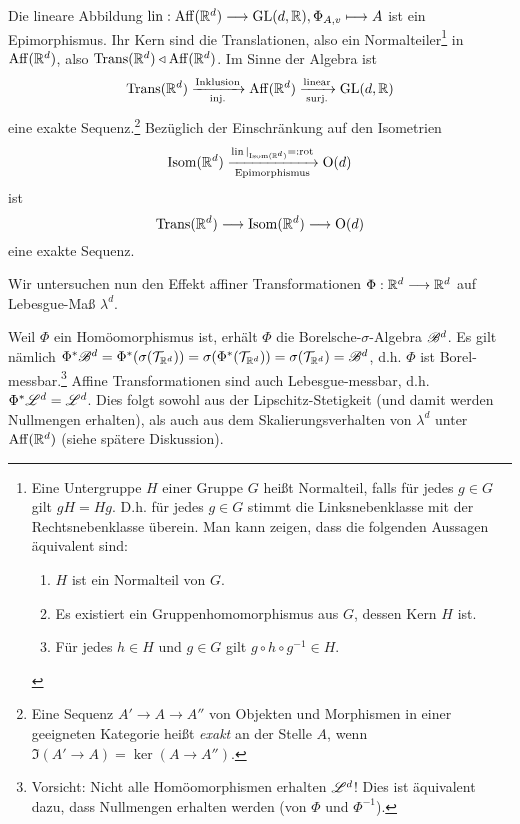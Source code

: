 \begin{remark}
Die lineare Abbildung $\operatorname{lin}:\operatorname{Aff}(\mathbb{R}^d) \overset{\operatorname{}}\longrightarrow \operatorname{GL}(d,\mathbb{R}), \Phi_{A,v} \longmapsto A$ ist ein Epimorphismus. Ihr Kern sind die Translationen, also ein  Normalteiler\footnote{Eine Untergruppe $H$ einer Gruppe $G$ heißt Normalteil, falls für jedes $g \in G$ gilt $gH=Hg$. D.h. für jedes $g\in G$ stimmt die Linksnebenklasse mit der Rechtsnebenklasse überein. Man kann zeigen, dass die folgenden Aussagen äquivalent sind:
\begin{enumerate}[topsep=0pt,itemsep=0pt]
\item $H$ ist ein Normalteil von $G$.
\item Es existiert ein Gruppenhomomorphismus aus $G$, dessen Kern $H$ ist.
\item Für jedes $h\in H$ und $g \in G$ gilt $g\circ h \circ g^{-1} \in H$.
\end{enumerate}\vspace{-0.7pc}} in $\operatorname{Aff}(\mathbb{R}^d)$, also $\operatorname{Trans}(\mathbb{R}^d) \triangleleft \operatorname{Aff}(\mathbb{R}^d)$. Im Sinne der Algebra ist 
$$
\operatorname{Trans} (\mathbb{R}^d) \xrightarrow[\text{inj.}]{\text{Inklusion}} \operatorname{Aff}(\mathbb{R}^d) \xrightarrow[\text{surj.}]{\text{linear}} \operatorname{GL}(d,\mathbb{R})
$$
 eine exakte Sequenz.\footnote{Eine Sequenz $A' \to A \to A''$ von Objekten und Morphismen in einer geeigneten Kategorie heißt \emph{exakt} an der Stelle $A$, wenn $\Im(A'\to A) = \ker(A \to A'')$.} Bezüglich der Einschränkung auf den Isometrien $$\operatorname{Isom}(\mathbb{R}^d)\xrightarrow[\text{Epimorphismus}]{\operatorname{lin}|_{\operatorname{Isom}(\mathbb{R}^d)}=:\operatorname{rot}} \operatorname{O}(d)$$ ist
$$
\operatorname{Trans}(\mathbb{R}^d) \longrightarrow \operatorname{Isom}(\mathbb{R}^d) \longrightarrow \operatorname{O}(d)
$$
eine exakte Sequenz.
\end{remark}

Wir untersuchen nun den Effekt affiner Transformationen $\Phi:\mathbb{R}^d\longrightarrow \mathbb{R}^d$ auf Lebesgue-Maß $\lambda^d$.\vspace{0.5pc}

Weil $\Phi$ ein Homöomorphismus ist, erhält $\Phi$ die Borelsche-$\sigma$-Algebra $\mathscr{B}^d$. Es gilt nämlich $\Phi^*\mathscr{B}^d= \Phi^*(\sigma(\mathcal{T}_{\mathbb{R}^d})) = \sigma (\Phi^*(\mathcal{T}_{\mathbb{R}^d})) = \sigma (\mathcal{T}_{\mathbb{R}^d})=\mathscr{B}^d$, d.h. $\Phi$ ist Borel-messbar.\footnote{Vorsicht: Nicht alle Homöomorphismen erhalten $\mathscr{L}^d$! Dies ist äquivalent dazu, dass Nullmengen erhalten werden (von $\Phi$ und $\Phi^{-1}$).} Affine Transformationen sind auch Lebesgue-messbar, d.h. $\Phi^* \mathscr{L}^d = \mathscr{L}^d$. Dies folgt sowohl aus der Lipschitz-Stetigkeit (und damit werden Nullmengen erhalten\Ueb), als auch aus dem Skalierungsverhalten von $\lambda^d$ unter $\operatorname{Aff}(\mathbb{R}^d)$ (siehe spätere Diskussion).\vspace{0.5pc}

